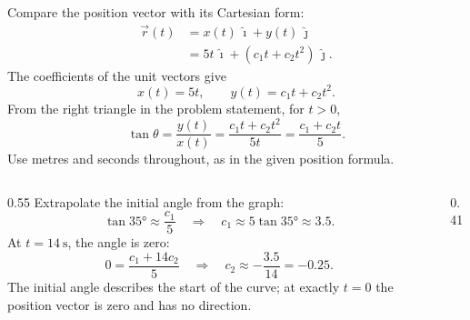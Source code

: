 \begin{solutionframe}
  Compare the position vector with its Cartesian form:
  \[
    \begin{aligned}
      \vec r(t)&=x(t)\,\hat{\imath}+y(t)\,\hat{\jmath}\\
         &=5t\,\hat{\imath}+(c_1t+c_2t^2)\,\hat{\jmath}.
    \end{aligned}
  \]
  The coefficients of the unit vectors give
  \[
    x(t)=5t,\qquad y(t)=c_1t+c_2t^2.
  \]
  From the right triangle in the problem statement, for $t>0$,
  \[
    \tan\theta=\frac{y(t)}{x(t)}
      =\frac{c_1t+c_2t^2}{5t}=\frac{c_1+c_2t}{5}.
  \]
  \footnotesize
  Use metres and seconds throughout, as in the given position formula.
\end{solutionframe}

\begin{solutionframe}
  \begin{columns}[T,onlytextwidth]
    \begin{column}{0.55\textwidth}
      Extrapolate the initial angle from the graph:
      \[
        \tan\ang{35}\approx\frac{c_1}{5}
        \quad\Rightarrow\quad c_1\approx5\tan\ang{35}\approx3.5.
      \]
      At $t=\SI{14}{\second}$, the angle is zero:
      \[
        0=\frac{c_1+14c_2}{5}
        \quad\Rightarrow\quad c_2\approx-\frac{3.5}{14}=-0.25.
      \]
      \footnotesize
      The initial angle describes the start of the curve; at exactly $t=0$
      the position vector is zero and has no direction.
    \end{column}
    \begin{column}{0.41\textwidth}
      \centering
      \resizebox{\linewidth}{!}{}
    \end{column}
  \end{columns}
\end{solutionframe}

